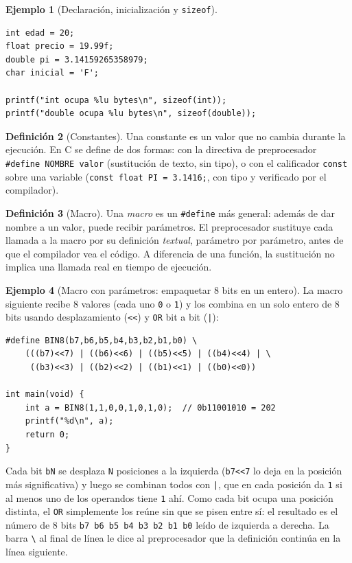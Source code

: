 \documentclass[11pt,letterpaper]{article}
\theoremstyle{definition}
\newtheorem{definicion}{Definición}[section]
\newtheorem{ejemplo}[definicion]{Ejemplo}
\begin{document}
\begin{ejemplo}[Declaración, inicialización y \texttt{sizeof}]
\begin{lstlisting}
int edad = 20;
float precio = 19.99f;
double pi = 3.14159265358979;
char inicial = 'F';

printf("int ocupa %lu bytes\n", sizeof(int));
printf("double ocupa %lu bytes\n", sizeof(double));
\end{lstlisting}
\end{ejemplo}

\begin{definicion}[Constantes]
Una constante es un valor que no cambia durante la ejecución. En C se define de dos formas: con la
directiva de preprocesador \texttt{\#define NOMBRE valor} (sustitución de texto, sin tipo), o con
el calificador \texttt{const} sobre una variable (\texttt{const float PI = 3.1416;}, con tipo y
verificado por el compilador).
\end{definicion}

\begin{definicion}[Macro]
Una \emph{macro} es un \texttt{\#define} más general: además de dar nombre a un valor, puede
recibir parámetros. El preprocesador sustituye cada llamada a la macro por su definición
\emph{textual}, parámetro por parámetro, antes de que el compilador vea el código. A diferencia de
una función, la sustitución no implica una llamada real en tiempo de ejecución.
\end{definicion}

\begin{ejemplo}[Macro con parámetros: empaquetar 8 bits en un entero]
La macro siguiente recibe 8 valores (cada uno \texttt{0} o \texttt{1}) y los combina en un solo
entero de 8 bits usando desplazamiento (\texttt{\textless\textless}) y \texttt{OR} bit a bit (\texttt{|}):
\begin{lstlisting}
#define BIN8(b7,b6,b5,b4,b3,b2,b1,b0) \
    (((b7)<<7) | ((b6)<<6) | ((b5)<<5) | ((b4)<<4) | \
     ((b3)<<3) | ((b2)<<2) | ((b1)<<1) | ((b0)<<0))

int main(void) {
    int a = BIN8(1,1,0,0,1,0,1,0);  // 0b11001010 = 202
    printf("%d\n", a);
    return 0;
}
\end{lstlisting}
Cada bit \texttt{bN} se desplaza \texttt{N} posiciones a la izquierda (\texttt{b7\textless\textless7} lo deja en la
posición más significativa) y luego se combinan todos con \texttt{|}, que en cada posición da
\texttt{1} si al menos uno de los operandos tiene \texttt{1} ahí. Como cada bit ocupa una posición
distinta, el \texttt{OR} simplemente los reúne sin que se pisen entre sí: el resultado es el número
de 8 bits \texttt{b7 b6 b5 b4 b3 b2 b1 b0} leído de izquierda a derecha. La barra \texttt{\textbackslash}
al final de línea le dice al preprocesador que la definición continúa en la línea siguiente.
\end{ejemplo}
\end{document}
